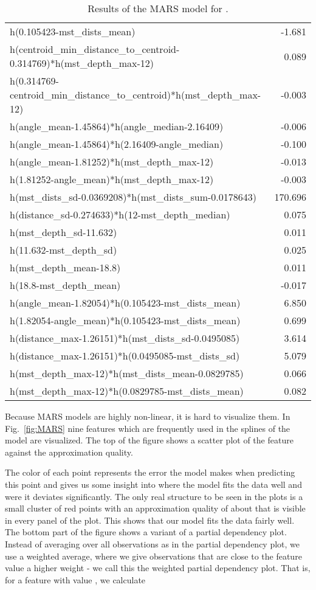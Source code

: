 \documentclass{article}
\begin{document}
\begin{table}
\begin{tabular}{lr}
  h(0.105423-mst\_dists\_mean) & -1.681 \\ 
  h(centroid\_min\_distance\_to\_centroid-0.314769)*h(mst\_depth\_max-12) & 0.089 \\ 
  h(0.314769-centroid\_min\_distance\_to\_centroid)*h(mst\_depth\_max-12) & -0.003 \\ 
  h(angle\_mean-1.45864)*h(angle\_median-2.16409) & -0.006 \\ 
  h(angle\_mean-1.45864)*h(2.16409-angle\_median) & -0.100 \\ 
  h(angle\_mean-1.81252)*h(mst\_depth\_max-12) & -0.013 \\ 
  h(1.81252-angle\_mean)*h(mst\_depth\_max-12) & -0.003 \\ 
  h(mst\_dists\_sd-0.0369208)*h(mst\_dists\_sum-0.0178643) & 170.696 \\ 
  h(distance\_sd-0.274633)*h(12-mst\_depth\_median) & 0.075 \\ 
  h(mst\_depth\_sd-11.632) & 0.011 \\ 
  h(11.632-mst\_depth\_sd) & 0.025 \\ 
  h(mst\_depth\_mean-18.8) & 0.011 \\ 
  h(18.8-mst\_depth\_mean) & -0.017 \\ 
  h(angle\_mean-1.82054)*h(0.105423-mst\_dists\_mean) & 6.850 \\ 
  h(1.82054-angle\_mean)*h(0.105423-mst\_dists\_mean) & 0.699 \\ 
  h(distance\_max-1.26151)*h(mst\_dists\_sd-0.0495085) & 3.614 \\ 
  h(distance\_max-1.26151)*h(0.0495085-mst\_dists\_sd) & 5.079 \\ 
  h(mst\_depth\_max-12)*h(mst\_dists\_mean-0.0829785) & 0.066 \\ 
  h(mst\_depth\_max-12)*h(0.0829785-mst\_dists\_mean) & 0.082 \\ 
   \bottomrule
\end{tabular}
   \caption{Results of the MARS model for .}
  \label{tab:MARS}
\end{table}

Because MARS models are highly non-linear, it is hard to visualize
them. In Fig.~\ref{fig:MARS} nine features which are frequently used
in the splines of the model are visualized. The top of the figure
shows a scatter plot of the feature against the approximation
quality.

The color of each point represents the error the model makes when
predicting this point and gives us some insight into where the model
fits the data well and were it deviates significantly. The only real
structure to be seen in the plots is a small cluster of red points with an
approximation quality of about  that is visible in every panel
of the plot. This shows that our model fits the data fairly well. The
bottom part of the figure shows a variant of a partial dependency
plot. Instead of averaging over all observations as in the partial
dependency plot, we use a weighted average, where we give observations
that are close to the feature value a higher weight - we call this the
weighted partial dependency plot. That is, for a feature  with
value , we calculate
\end{document}
